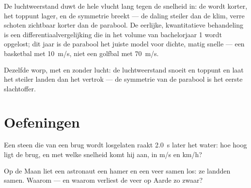 \begin{remark}\label{rem:g12:projectile-motion:drag}
De luchtweerstand duwt de hele vlucht lang tegen de snelheid in: de  wordt
korter, het toppunt lager, en de symmetrie breekt --- de daling steiler dan
de klim, verre schoten zichtbaar korter dan de parabool. De eerlijke,
kwantitatieve behandeling is een differentiaalvergelijking die in het volume
van bachelorjaar 1 wordt opgelost; dit jaar is de parabool het juiste model
voor dichte, matig snelle  --- een basketbal met \qty{10}{m/s},
niet een golfbal met \qty{70}{m/s}.
\end{remark}

\begin{omfigure}

{\small Dezelfde worp, met en zonder lucht: de luchtweerstand snoeit  en
toppunt en laat het  steiler landen dan het vertrok --- de
symmetrie van de parabool is het eerste slachtoffer.}
\end{omfigure}

\section{Oefeningen}

\begin{exercise}[$\star$]\label{exo:g12:projectile-motion:1}
Een steen die van een brug wordt losgelaten raakt \qty{2.0}{s} later het
water: hoe hoog ligt de brug, en met welke snelheid komt hij aan, in
\unit{m/s} en \unit{km/h}?
\end{exercise}

\begin{exercise}[$\star$]\label{exo:g12:projectile-motion:2}
Op de Maan liet een astronaut een hamer en een veer samen los: ze landden
samen. Waarom --- en waarom verliest de veer op Aarde zo zwaar?
\end{exercise}

